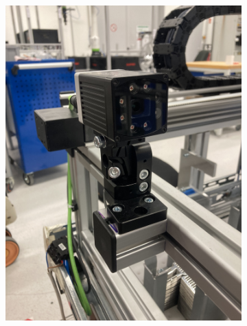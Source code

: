 \begin{enumerate}
    \begin{figure}[h]
        \centering
        \begin{subfigure}{0.5\textwidth}
            \centering
            \includegraphics[width=\textwidth, angle=-90]{figures/inspection-camera.jpg} %
            \caption{}
            \label{fig:inspection-camera}
        \end{subfigure}\hspace{-1.5cm}
        \begin{subfigure}{0.5\textwidth}
            \centering

\end{subfigure}
\end{figure}
\end{enumerate}
